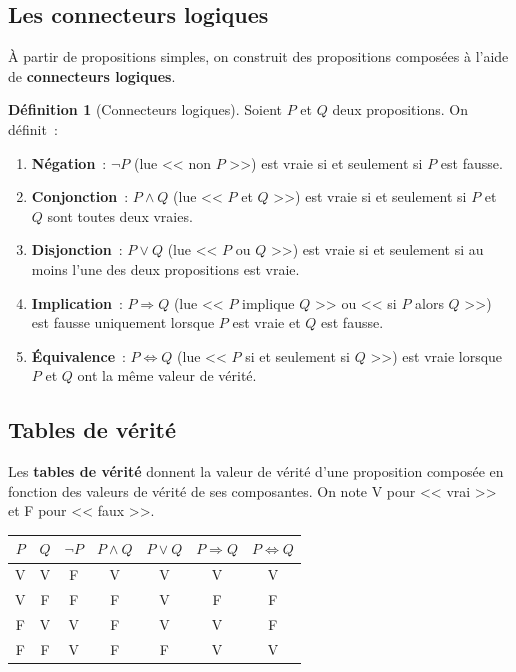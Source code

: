 \documentclass[12pt,a4paper,openany]{book}
\theoremstyle{definition}
\newtheorem{definition}{Définition}[chapter]
\begin{document}
\subsection{Les connecteurs logiques}

À partir de propositions simples, on construit des propositions composées à l'aide de \textbf{connecteurs logiques}.

\begin{definition}[Connecteurs logiques]\label{def:connecteurs}
  Soient $P$ et $Q$ deux propositions. On définit~:
  \begin{enumerate}[label=(\roman*)]
    \item \textbf{Négation}~: $\lnot P$ (lue << non $P$ >>) est vraie si et seulement si $P$ est fausse.
    \item \textbf{Conjonction}~: $P \land Q$ (lue << $P$ et $Q$ >>) est vraie si et seulement si $P$ et $Q$ sont toutes deux vraies.
    \item \textbf{Disjonction}~: $P \lor Q$ (lue << $P$ ou $Q$ >>) est vraie si et seulement si au moins l'une des deux propositions est vraie.
    \item \textbf{Implication}~: $P \Rightarrow Q$ (lue << $P$ implique $Q$ >> ou << si $P$ alors $Q$ >>) est fausse uniquement lorsque $P$ est vraie et $Q$ est fausse.
    \item \textbf{Équivalence}~: $P \Leftrightarrow Q$ (lue << $P$ si et seulement si $Q$ >>) est vraie lorsque $P$ et $Q$ ont la même valeur de vérité.
  \end{enumerate}
\end{definition}

\subsection{Tables de vérité}

Les \textbf{tables de vérité} donnent la valeur de vérité d'une proposition composée en fonction des valeurs de vérité de ses composantes. On note V pour << vrai >> et F pour << faux >>.

\bigskip
\begin{center}
\begin{tabular}{cc|c|c|c|c|c}
$P$ & $Q$ & $\lnot P$ & $P \land Q$ & $P \lor Q$ & $P \Rightarrow Q$ & $P \Leftrightarrow Q$ \\
\hline
V & V & F & V & V & V & V \\
V & F & F & F & V & F & F \\
F & V & V & F & V & V & F \\
F & F & V & F & F & V & V \\
\end{tabular}
\end{center}
\end{document}
